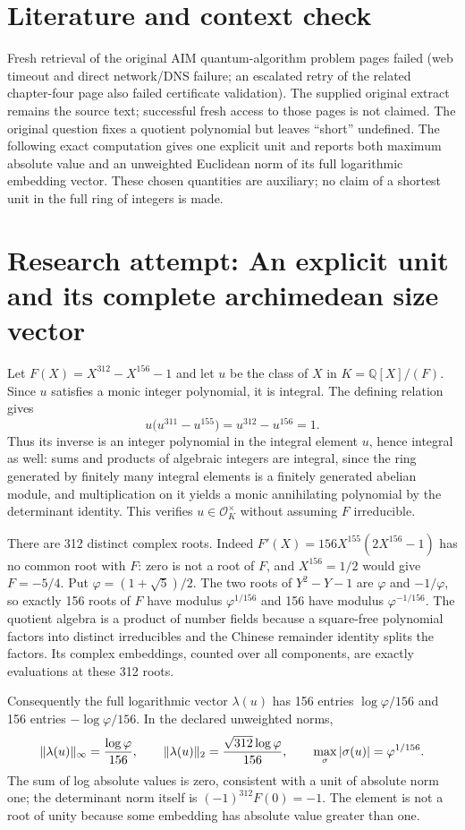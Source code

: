 \documentclass[11pt]{article}
\begin{document}
\section{Literature and context check}
Fresh retrieval of the original AIM quantum-algorithm problem pages failed (web timeout and direct network/DNS failure; an escalated retry of the related chapter-four page also failed certificate validation). The supplied original extract remains the source text; successful fresh access to those pages is not claimed. The original question fixes a quotient polynomial but leaves ``short'' undefined. The following exact computation gives one explicit unit and reports both maximum absolute value and an unweighted Euclidean norm of its full logarithmic embedding vector. These chosen quantities are auxiliary; no claim of a shortest unit in the full ring of integers is made.
\section{Research attempt: An explicit unit and its complete archimedean size vector}
Let $F(X)=X^{312}-X^{156}-1$ and let $u$ be the class of $X$ in $K=\mathbb Q[X]/(F)$. Since $u$ satisfies a monic integer polynomial, it is integral. The defining relation gives
\[
 u\bigl(u^{311}-u^{155}\bigr)=u^{312}-u^{156}=1.
\]
Thus its inverse is an integer polynomial in the integral element $u$, hence integral as well: sums and products of algebraic integers are integral, since the ring generated by finitely many integral elements is a finitely generated abelian module, and multiplication on it yields a monic annihilating polynomial by the determinant identity. This verifies $u\in\mathcal O_K^\times$ without assuming $F$ irreducible.

There are 312 distinct complex roots. Indeed $F'(X)=156X^{155}(2X^{156}-1)$ has no common root with $F$: zero is not a root of $F$, and $X^{156}=1/2$ would give $F=-5/4$. Put $\varphi=(1+\sqrt5)/2$. The two roots of $Y^2-Y-1$ are $\varphi$ and $-1/\varphi$, so exactly 156 roots of $F$ have modulus $\varphi^{1/156}$ and 156 have modulus $\varphi^{-1/156}$. The quotient algebra is a product of number fields because a square-free polynomial factors into distinct irreducibles and the Chinese remainder identity splits the factors. Its complex embeddings, counted over all components, are exactly evaluations at these 312 roots.

Consequently the full logarithmic vector $\lambda(u)$ has 156 entries $\log\varphi/156$ and 156 entries $-\log\varphi/156$. In the declared unweighted norms,
\[
 \|\lambda(u)\|_\infty={\log\varphi\over156},\qquad
 \|\lambda(u)\|_2={\sqrt{312}\log\varphi\over156},\qquad
 \max_\sigma|\sigma(u)|=\varphi^{1/156}.
\]
The sum of log absolute values is zero, consistent with a unit of absolute norm one; the determinant norm itself is $(-1)^{312}F(0)=-1$. The element is not a root of unity because some embedding has absolute value greater than one.
\end{document}
